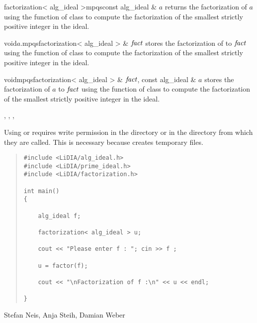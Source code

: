 \begin{fcode}{factorization< alg_ideal >}{mpqs}{const alg_ideal & $a$}
  returns the factorization of $a$ using the function  of class
   to compute the factorization of the smallest strictly positive
  integer in the ideal.
\end{fcode}

\begin{cfcode}{void}{$a$.mpqs}{factorization< alg_ideal > & $\mathit{fact}$}
  stores the factorization of  to $\mathit{fact}$ using the function  of
  class  to compute the factorization of the smallest strictly
  positive integer in the ideal.
\end{cfcode}

\begin{fcode}{void}{mpqs}{factorization< alg_ideal > & $\mathit{fact}$,
    const alg_ideal & $a$} stores the factorization of $a$ to $\mathit{fact}$ using the function
   of class  to compute the factorization of the
  smallest strictly positive integer in the ideal.
\end{fcode}



\SEEALSO

, ,
,



\WARNINGS

Using  or  requires write permission in the  directory or in
the directory from which they are called.  This is necessary because  creates
temporary files.



\EXAMPLES

\begin{quote}
\begin{verbatim}
#include <LiDIA/alg_ideal.h>
#include <LiDIA/prime_ideal.h>
#include <LiDIA/factorization.h>

int main()
{

    alg_ideal f;

    factorization< alg_ideal > u;

    cout << "Please enter f : "; cin >> f ;

    u = factor(f);

    cout << "\nFactorization of f :\n" << u << endl;

}
\end{verbatim}
\end{quote}



\AUTHOR

Stefan Neis, Anja Steih, Damian Weber
